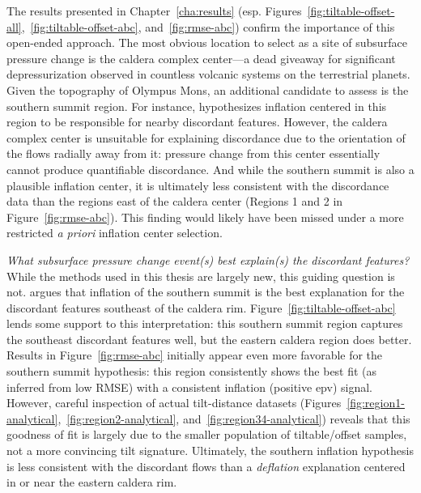 The results presented in Chapter~\ref{cha:results} (esp. Figures~\ref{fig:tiltable-offset-all},~\ref{fig:tiltable-offset-abc}, and~\ref{fig:rmse-abc}) confirm the importance of this open-ended approach. The most obvious location to select as a site of subsurface pressure change is the caldera complex center---a dead giveaway for significant depressurization observed in countless volcanic systems on the terrestrial planets. Given the topography of Olympus Mons, an additional candidate to assess is the southern summit region. For instance, \textcite{mouginis-mark_late-stage_2019} hypothesizes inflation centered in this region to be responsible for nearby discordant features. However, the caldera complex center is unsuitable for explaining discordance due to the orientation of the flows radially away from it: pressure change from this center essentially cannot produce quantifiable discordance. And while the southern summit is also a plausible inflation center, \parencite[Figures~\ref{fig:tiltable-offset-abc} and~\ref{fig:rmse-abc}, also suggested by][]{mouginis-mark_late-stage_2019} it is ultimately less consistent with the discordance data than the regions east of the caldera center (Regions 1 and 2 in Figure~\ref{fig:rmse-abc}). This finding would likely have been missed under a more restricted \emph{a priori} inflation center selection. 

\emph{What subsurface pressure change event(s) best explain(s) the discordant features?} While the methods used in this thesis are largely new, this guiding question is not. \parencite{mouginis-mark_late-stage_2019} argues that inflation of the southern summit is the best explanation for the discordant features southeast of the caldera rim. Figure~\ref{fig:tiltable-offset-abc} lends some support to this interpretation: this southern summit region captures the southeast discordant features well, but the eastern caldera region does better. Results in Figure~\ref{fig:rmse-abc} initially appear even more favorable for the southern summit hypothesis: this region consistently shows the best fit (as inferred from low \acs{RMSE}) with a consistent inflation (positive \acs{epv}) signal. However, careful inspection of actual tilt-distance datasets (Figures~\ref{fig:region1-analytical},~\ref{fig:region2-analytical}, and~\ref{fig:region34-analytical}) reveals that this goodness of fit is largely due to the smaller population of tiltable/offset samples, not a more convincing tilt signature. Ultimately, the southern inflation hypothesis is less consistent with the discordant flows than a \emph{deflation} explanation centered in or near the eastern caldera rim.

